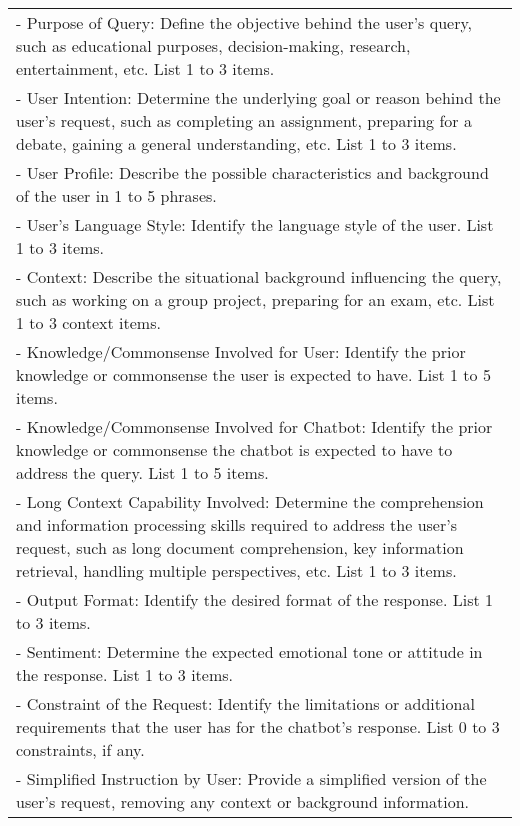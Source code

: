 \begin{table}[h!]
\begin{minipage}{\textwidth}
\begin{tcolorbox}
\begin{tabular}{p{}}
         - Purpose of Query: Define the objective behind the user's query, such as educational purposes, decision-making, research, entertainment, etc. List 1 to 3 items.
         \\ \hspace{0.4em} - User Intention: Determine the underlying goal or reason behind the user's request, such as completing an assignment, preparing for a debate, gaining a general understanding, etc. List 1 to 3 items.
         \\ \hspace{0.4em} - User Profile: Describe the possible characteristics and background of the user in 1 to 5 phrases.
         \\ \hspace{0.4em} - User's Language Style: Identify the language style of the user. List 1 to 3 items.
         \\ \hspace{0.4em} - Context: Describe the situational background influencing the query, such as working on a group project, preparing for an exam, etc. List 1 to 3 context items.
         \\ \hspace{0.4em} - Knowledge/Commonsense Involved for User: Identify the prior knowledge or commonsense the user is expected to have. List 1 to 5 items.
         \\ \hspace{0.4em} - Knowledge/Commonsense Involved for Chatbot: Identify the prior knowledge or commonsense the chatbot is expected to have to address the query. List 1 to 5 items.
         \\ \hspace{0.4em} - Long Context Capability Involved: Determine the comprehension and information processing skills required to address the user's request, such as long document comprehension, key information retrieval, handling multiple perspectives, etc. List 1 to 3 items.
         \\ \hspace{0.4em} - Output Format: Identify the desired format of the response. List 1 to 3 items.
         \\ \hspace{0.4em} - Sentiment: Determine the expected emotional tone or attitude in the response. List 1 to 3 items.
         \\ \hspace{0.4em} - Constraint of the Request: Identify the limitations or additional requirements that the user has for the chatbot's response. List 0 to 3 constraints, if any.
         \\ \hspace{0.4em} - Simplified Instruction by User: Provide a simplified version of the user's request, removing any context or background information.


\end{tabular}
\end{tcolorbox}
\end{minipage}
\end{table}
